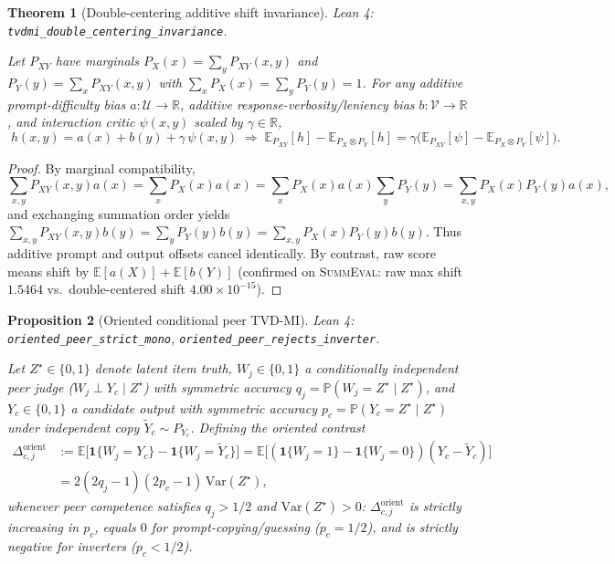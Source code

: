 \documentclass[11pt]{article}
\theoremstyle{plain}
\newtheorem{theorem}{Theorem}[section]
\newtheorem{proposition}[theorem]{Proposition}
\theoremstyle{definition}
\theoremstyle{remark}
\newcommand{\E}{\mathbb{E}}
\newcommand{\Prob}{\mathbb{P}}
\newcommand{\Var}{\mathrm{Var}}
\newcommand{\R}{\mathbb{R}}
\newcommand{\lident}[1]{{\small\texttt{#1}}}
\begin{document}
\begin{theorem}[Double-centering additive shift invariance]
\label{thm:dc}
\noindent\textit{Lean 4:} \lident{tvdmi\_\allowbreak double\_\allowbreak centering\_\allowbreak invariance}.\par\medskip
Let $P_{XY}$ have marginals $P_X(x) = \sum_y P_{XY}(x,y)$ and $P_Y(y) = \sum_x P_{XY}(x,y)$
with $\sum_x P_X(x) = \sum_y P_Y(y) = 1$. For any additive prompt-difficulty bias
$a : \mathcal{U} \to \R$, additive response-verbosity/leniency bias $b : \mathcal{V} \to \R$,
and interaction critic $\psi(x,y)$ scaled by $\gamma \in \R$,
\begin{equation}
\boxed{\;
h(x,y) = a(x) + b(y) + \gamma\,\psi(x,y)
\;\Longrightarrow\;
\E_{P_{XY}}[h] - \E_{P_X \otimes P_Y}[h] = \gamma\Big(\E_{P_{XY}}[\psi] - \E_{P_X \otimes P_Y}[\psi]\Big).\;}
\end{equation}
\end{theorem}
\begin{proof}
By marginal compatibility,
\[
  \sum_{x,y} P_{XY}(x,y) a(x) = \sum_x P_X(x) a(x) = \sum_x P_X(x)a(x)\sum_y P_Y(y) = \sum_{x,y} P_X(x)P_Y(y)a(x),
\]
and exchanging summation order yields $\sum_{x,y} P_{XY}(x,y)b(y) = \sum_y P_Y(y)b(y) = \sum_{x,y} P_X(x)P_Y(y)b(y)$.
Thus additive prompt and output offsets cancel identically. By contrast, raw
score means shift by $\E[a(X)] + \E[b(Y)]$ (confirmed on \textsc{SummEval}: raw
max shift $1.5464$ vs.\ double-centered shift $4.00\times 10^{-15}$).
\end{proof}

\begin{proposition}[Oriented conditional peer TVD-MI]
\noindent\textit{Lean 4:} \lident{oriented\_\allowbreak peer\_\allowbreak strict\_\allowbreak mono},
\lident{oriented\_\allowbreak peer\_\allowbreak rejects\_\allowbreak inverter}.\par\medskip
Let $Z^\star \in \{0,1\}$ denote latent item truth, $W_j \in \{0,1\}$ a
conditionally independent peer judge ($W_j \perp Y_c \mid Z^\star$) with
symmetric accuracy $q_j = \Prob(W_j = Z^\star \mid Z^\star)$, and
$Y_c \in \{0,1\}$ a candidate output with symmetric accuracy
$p_c = \Prob(Y_c = Z^\star \mid Z^\star)$ under independent copy
$\widetilde{Y}_c \sim P_{Y_c}$. Defining the oriented contrast
\begin{align*}
  \Delta^{\mathrm{orient}}_{c,j}
  &:= \E\!\big[\mathbf{1}\{W_j = Y_c\} - \mathbf{1}\{W_j = \widetilde{Y}_c\}\big]
  = \E\!\big[(\mathbf{1}\{W_j = 1\} - \mathbf{1}\{W_j = 0\})(Y_c - \widetilde{Y}_c)\big] \\
  &= 2(2q_j - 1)(2p_c - 1)\,\Var(Z^\star),
\end{align*}
whenever peer competence satisfies $q_j > 1/2$ and $\Var(Z^\star) > 0$:
$\Delta^{\mathrm{orient}}_{c,j}$ is strictly increasing in $p_c$, equals $0$ for
prompt-copying/guessing ($p_c = 1/2$), and is strictly negative for inverters ($p_c < 1/2$).
\end{proposition}
\end{document}
